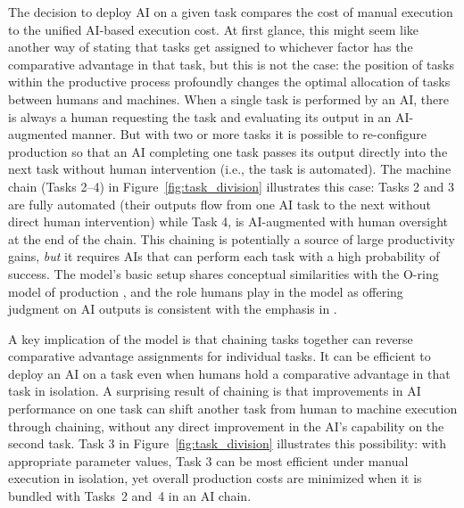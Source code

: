 \documentclass{article}
\theoremstyle{plain}
\theoremstyle{plain}
\begin{document}
The decision to deploy AI on a given task compares the cost of manual execution to the unified AI-based execution cost.  
At first glance, this might seem like another way of stating that tasks get assigned to whichever factor has the comparative advantage in that task, but this is not the case: the position of tasks within the productive process profoundly changes the optimal allocation of tasks between humans and machines.
When a single task is performed by an AI, there is always a human requesting the task and evaluating its output in an AI-augmented manner.  
But with two or more tasks it is possible to re-configure production so that an AI completing one task passes its output directly into the next task without human intervention (i.e., the task is automated).  
The machine chain (Tasks 2--4) in Figure~\ref{fig:task_division} illustrates this case: Tasks 2 and 3 are fully automated (their outputs flow from one AI task to the next without direct human intervention) while Task 4, is AI-augmented with human oversight at the end of the chain.
This chaining is potentially a source of large productivity gains, \emph{but} it requires AIs that can perform each task with a high probability of success.  
The model’s basic setup shares conceptual similarities with the O-ring model of production \citep{kremer1993}, and the role humans  play in the model as offering judgment on AI outputs is consistent with the emphasis in \cite{agrawal2019exploring}.

A key implication of the model is that chaining tasks together can reverse comparative advantage assignments for individual tasks.
It can be efficient to deploy an AI on a task even when humans hold a comparative advantage in that task in isolation.
A surprising result of chaining is that improvements in AI performance on one task can shift another task from human to machine execution through chaining, without any direct improvement in the AI’s capability on the second task.
Task 3 in Figure~\ref{fig:task_division} illustrates this possibility: with appropriate parameter values, Task 3 can be most efficient under manual execution in isolation, yet overall production costs are minimized when it is bundled with Tasks~2 and~4 in an AI chain.
\end{document}
